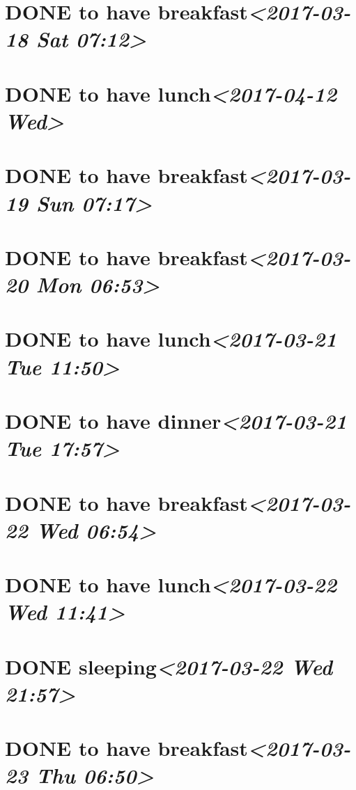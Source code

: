 \documentclass[cyan]{elegantnote}
\begin{document}
\section{{\bfseries\sffamily DONE} to have breakfast\textit{<2017-03-18 Sat 07:12>}}
\label{sec:orgc222c49}
\section{{\bfseries\sffamily DONE} to have lunch\textit{<2017-04-12 Wed>}}
\label{sec:org1fbb932}
\section{{\bfseries\sffamily DONE} to have breakfast\textit{<2017-03-19 Sun 07:17>}}
\label{sec:orgc3538f3}
\section{{\bfseries\sffamily DONE} to have breakfast\textit{<2017-03-20 Mon 06:53>}}
\label{sec:orgb5b9277}
\section{{\bfseries\sffamily DONE} to have lunch\textit{<2017-03-21 Tue 11:50>}}
\label{sec:org519570b}
\section{{\bfseries\sffamily DONE} to have dinner\textit{<2017-03-21 Tue 17:57>}}
\label{sec:org6e93bf2}
\section{{\bfseries\sffamily DONE} to have breakfast\textit{<2017-03-22 Wed 06:54>}}
\label{sec:org8d16efd}
\section{{\bfseries\sffamily DONE} to have lunch\textit{<2017-03-22 Wed 11:41>}}
\label{sec:org86013bf}
\section{{\bfseries\sffamily DONE} sleeping\textit{<2017-03-22 Wed 21:57>}}
\label{sec:org1588f67}
\section{{\bfseries\sffamily DONE} to have breakfast\textit{<2017-03-23 Thu 06:50>}}
\label{sec:orgd78e1a8}
\end{document}
